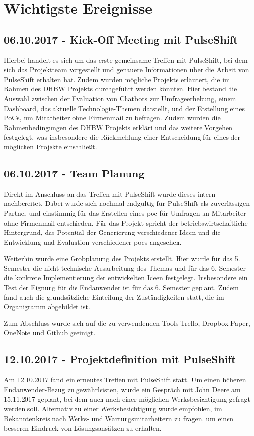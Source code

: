 \chapter{Wichtigste Ereignisse}
\section{06.10.2017 - Kick-Off Meeting mit PulseShift}
Hierbei handelt es sich um das erste gemeinsame Treffen mit PulseShift, bei dem sich das Projektteam vorgestellt und genauere Informationen über die Arbeit von PulseShift erhalten hat. Zudem wurden mögliche Projekte erläutert, die im Rahmen des DHBW Projekts durchgeführt werden könnten. Hier bestand die Auswahl zwischen der Evaluation von Chatbots zur Umfrageerhebung, einem Dashboard, das aktuelle Technologie-Themen darstellt, und der Erstellung eines PoCs, um Mitarbeiter ohne Firmenmail zu befragen. Zudem wurden die Rahmenbedingungen des DHBW Projekts erklärt und das weitere Vorgehen festgelegt, was insbesondere die Rückmeldung einer Entscheidung für eines der möglichen Projekte einschließt.

\section{06.10.2017 - Team Planung}
Direkt im Anschluss an das Treffen mit PulseShift wurde dieses intern nachbereitet. Dabei wurde sich nochmal endgültig für PulseShift als zuverlässigen Partner und einstimmig für das Erstellen eines \gls{poc} für Umfragen an Mitarbeiter ohne Firmenmail entschieden. Für das Projekt spricht der betriebswirtschaftliche Hintergrund, das Potential der Generierung verschiedener Ideen und die Entwicklung und Evaluation verschiedener \gls{poc}s angesehen.

Weiterhin wurde eine Grobplanung des Projekts erstellt. Hier wurde für das 5. Semester die nicht-technische Ausarbeitung des Themas und für das 6. Semester die konkrete Implementierung der entwickelten Ideen festgelegt. Insbesondere ein Test der Eignung für die Endanwender ist für das 6. Semester geplant. Zudem fand auch die grundsätzliche Einteilung der Zuständigkeiten statt, die im Organigramm abgebildet ist.

Zum Abschluss wurde sich auf die zu verwendenden Tools Trello, Dropbox Paper, OneNote und Github geeinigt.

\section{12.10.2017 - Projektdefinition mit PulseShift}
Am 12.10.2017 fand ein erneutes Treffen mit PulseShift statt. Um einen höheren Endanwender-Bezug zu gewährleisten, wurde ein Gespräch mit John Deere am 15.11.2017 geplant, bei dem auch nach einer möglichen Werksbesichtigung gefragt werden soll. Alternativ zu einer Werksbesichtigung wurde empfohlen, im Bekanntenkreis nach Werks- und Wartungsmitarbeitern zu fragen, um einen besseren Eindruck von Lösungsansätzen zu erhalten.

